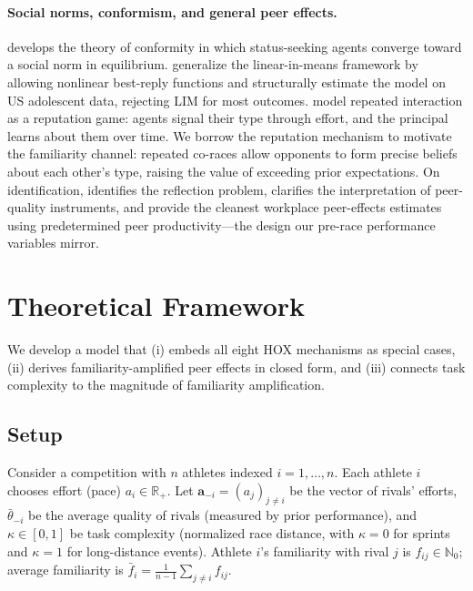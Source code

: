 \documentclass[12pt]{article}
\theoremstyle{definition}
\theoremstyle{remark}
\begin{document}
\paragraph{Social norms, conformism, and general peer effects.}
\citet{Bernheim1994} develops the theory of conformity in which status-seeking
agents converge toward a social norm in equilibrium.
\citet{Boucher2024} generalize the linear-in-means framework by allowing
nonlinear best-reply functions and structurally estimate the model on
US adolescent data, rejecting LIM for most outcomes.
\citet{BenabouTirole2006} model repeated interaction as a reputation game:
agents signal their type through effort, and the principal learns about them
over time.
We borrow the reputation mechanism to motivate the familiarity channel: repeated
co-races allow opponents to form precise beliefs about each other's type, raising
the value of exceeding prior expectations.
On identification, \citet{Manski1993} identifies the reflection problem,
\citet{Angrist2014} clarifies the interpretation of peer-quality instruments,
and \citet{CornelissenDustmannSchonberg2017} provide the cleanest workplace
peer-effects estimates using predetermined peer productivity---the design our
pre-race performance variables mirror.

\section{Theoretical Framework}
\label{sec:theory}

We develop a model that (i) embeds all eight HOX mechanisms as special cases,
(ii) derives familiarity-amplified peer effects in closed form,
and (iii) connects task complexity to the magnitude of familiarity amplification.

\subsection{Setup}

Consider a competition with $n$ athletes indexed $i = 1,\ldots,n$.
Each athlete $i$ chooses effort (pace) $a_i \in \mathbb{R}_+$.
Let $\mathbf{a}_{-i} = (a_j)_{j\neq i}$ be the vector of rivals' efforts,
$\bar{\theta}_{-i}$ be the average quality of rivals (measured by prior
performance), and $\kappa \in [0,1]$ be task complexity
(normalized race distance, with $\kappa=0$ for sprints and $\kappa=1$
for long-distance events).
Athlete $i$'s familiarity with rival $j$ is $f_{ij} \in \mathbb{N}_0$;
average familiarity is $\bar{f}_i = \frac{1}{n-1}\sum_{j\neq i}f_{ij}$.
\end{document}
